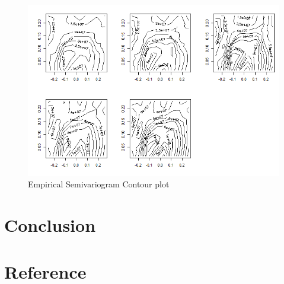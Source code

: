 \documentclass[hidelinks,12pt]{article}
\begin{document}
\begin{figure}[!ht]
		\includegraphics[width=\textwidth]{esc.png}
		\caption{Empirical Semivariogram Contour plot\label{fig:esc}}
\end{figure}
\FloatBarrier




	\section{Conclusion}\label{sec:con}
	
	\section{Reference}\label{sec:ref}
	
	
	\newpage
	\appendix
\end{document}
